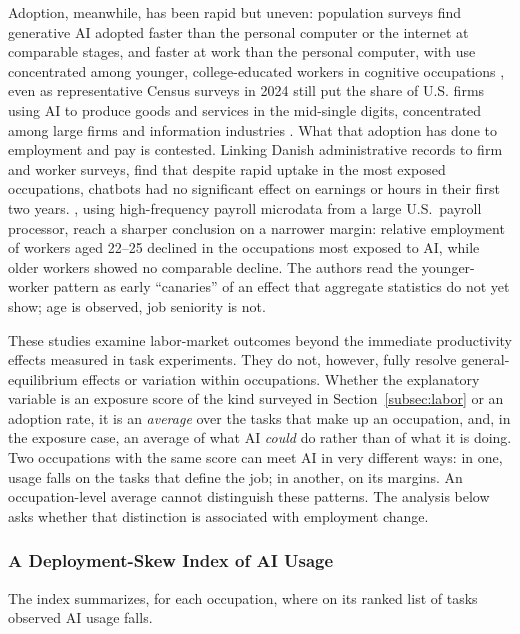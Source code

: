 \documentclass[12pt]{article}
\theoremstyle{plain}
\theoremstyle{definition}
\theoremstyle{remark}
\begin{document}
Adoption, meanwhile, has been rapid but uneven: population surveys find
generative AI adopted faster than the personal computer or the internet at
comparable stages, and faster at work than the personal computer, with use
concentrated among younger, college-educated
workers in cognitive occupations \citep{BickBlandinDeming2025}, even as
representative Census surveys in 2024 still put the share of U.S. firms using
AI to produce goods and services in the mid-single digits, concentrated
among large firms and information industries \citep{BonneyEtAl2024}. What that
adoption has done to employment and pay is contested. Linking Danish
administrative records to firm and worker surveys,
\citet{HumlumVestergaard2025} find that despite rapid uptake in the most
exposed occupations, chatbots had no significant effect on earnings or hours in
their first two years. \citet{BrynjolfssonChandarChen2025}, using
high-frequency payroll microdata from a large U.S.\ payroll processor, reach a
sharper conclusion on a narrower margin: relative employment of workers aged
22--25 declined in the occupations most exposed to AI, while older workers
showed no comparable decline. The authors read the younger-worker pattern
as early ``canaries'' of an effect that aggregate statistics do not yet show;
age is observed, job seniority is not.

These studies examine labor-market outcomes beyond the immediate
productivity effects measured in task experiments. They do not, however,
fully resolve general-equilibrium effects or variation within occupations. Whether the explanatory variable is an exposure score of the
kind surveyed in Section~\ref{subsec:labor} or an adoption rate, it is an
\emph{average} over the tasks that make up an occupation, and, in the exposure
case, an average of what AI \emph{could} do rather than of what it is doing.
Two occupations with the same score can meet AI in very different ways: in
one, usage falls on the tasks that define the job; in another, on its
margins. An occupation-level average cannot distinguish these patterns. The
analysis below asks whether that distinction is associated with
employment change.

\subsubsection{A Deployment-Skew Index of AI Usage}

The index summarizes, for each occupation, where on its ranked list of
tasks observed AI usage falls.
\end{document}
